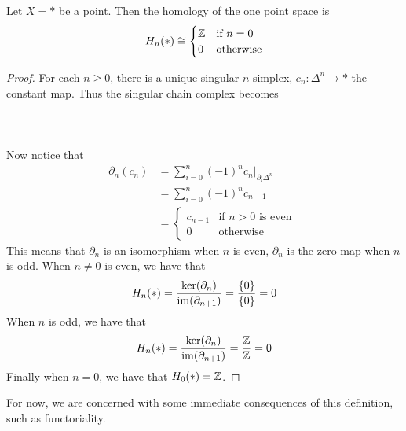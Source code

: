 \documentclass[a4paper]{article}
\begin{document}
\begin{eg}{}{} Let $X=\ast$ be a point. Then the homology of the one point space is $$H_n(\ast)\cong\begin{cases}
\mathbb{Z} & \text{if } n=0\\
0 & \text{otherwise}
\end{cases}$$ \tcbline
\begin{proof}
For each $n\geq 0$, there is a unique singular $n$-simplex, $c_n:\Delta^n\to\ast$ the constant map. Thus the singular chain complex becomes \\~\\
\\~\\
Now notice that 
\begin{align*}
\partial_n(c_n)&=\sum_{i=0}^n(-1)^nc_n|_{\partial_i\Delta^n}\\
&=\sum_{i=0}^n(-1)^nc_{n-1}\\
&=\begin{cases}
c_{n-1} & \text{if } n>0\text{ is even }\\
0 & \text{otherwise }
\end{cases}
\end{align*}
This means that $\partial_n$ is an isomorphism when $n$ is even, $\partial_n$ is the zero map when $n$ is odd. When $n\neq 0$ is even, we have that $$H_n(\ast)=\frac{\ker(\partial_n)}{\operatorname{im}(\partial_{n+1})}=\frac{\{0\}}{\{0\}}=0$$ When $n$ is odd, we have that $$H_n(\ast)=\frac{\ker(\partial_n)}{\operatorname{im}(\partial_{n+1})}=\frac{\mathbb{Z}}{\mathbb{Z}}=0$$ Finally when $n=0$, we have that $H_0(\ast)=\mathbb{Z}$. 
\end{proof}
\end{eg}

For now, we are concerned with some immediate consequences of this definition, such as functoriality. 
\end{document}
